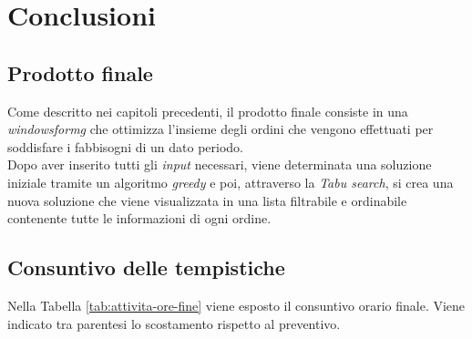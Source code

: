 
\chapter{Conclusioni}
\label{cap:conclusioni}
\noindent {}
\section{Prodotto finale}
\noindent Come descritto nei capitoli precedenti, il prodotto finale consiste in una \textit{\gls{windowsformg}} che
ottimizza l'insieme degli ordini che vengono effettuati per soddisfare i
fabbisogni di un dato periodo.\\

\noindent Dopo aver inserito tutti gli \textit{input} necessari,
viene determinata una soluzione iniziale tramite un algoritmo \textit{greedy} e poi, attraverso la
\textit{Tabu search}, si crea una nuova soluzione che viene visualizzata in una lista
filtrabile e ordinabile contenente tutte le informazioni di ogni ordine.

\section{Consuntivo delle tempistiche}
\noindent Nella Tabella \ref{tab:attivita-ore-fine} viene esposto il consuntivo orario finale. Viene indicato tra parentesi lo scostamento rispetto al preventivo.
\renewcommand{\arraystretch}{1.6}

